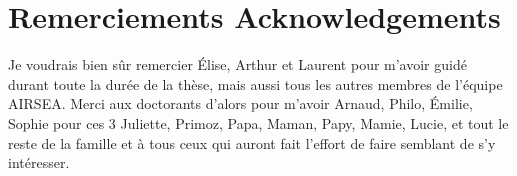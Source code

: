 \documentclass[../../Main_ManuscritThese.tex]{subfiles}
\begin{document}
\chapter*{Remerciements Acknowledgements}
\TitleBtwLines
{}
{}
\pagestyle{empty}


Je voudrais bien sûr remercier Élise, Arthur et Laurent pour m'avoir
guidé durant toute la durée de la thèse, mais aussi tous les autres
membres de l'équipe AIRSEA.  Merci aux doctorants d'alors pour m'avoir
Arnaud, Philo, Émilie, Sophie
pour ces 3
Juliette, Primoz, Papa, Maman, Papy, Mamie, Lucie, et tout le reste de la famille
et à tous ceux qui auront fait l'effort de faire semblant de s'y intéresser.


\markchapterend
\end{document}
